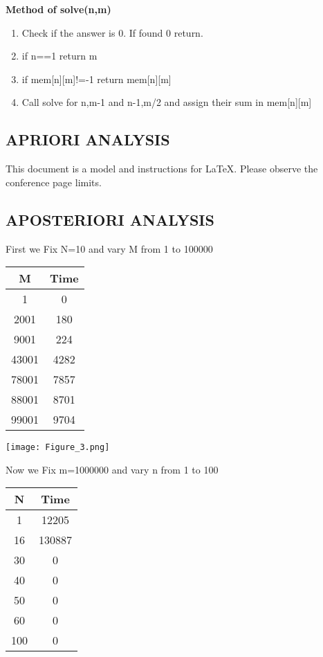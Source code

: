 \documentclass[conference]{IEEEtran}
\begin{document}
\textbf{Method of solve(n,m)}

\begin{enumerate}
    \item Check if the answer is 0. If found 0 return.
    \item if n==1 return m
    \item if mem[n][m]!=-1 return mem[n][m]
    \item Call solve for n,m-1 and n-1,m/2 and assign their sum in mem[n][m]
	
\end{enumerate}

\subsection{APRIORI ANALYSIS }

This document is a model and instructions for \LaTeX.
Please observe the conference page limits. 

\subsection{APOSTERIORI ANALYSIS }

First we Fix N=10 and vary M from 1 to 100000

\begin{center}
   \begin{tabular}{|c|c|}
   \hline
   M & Time \\
   \hline\hline
    1 & 0 \\
    \hline
    2001 & 180 \\
    \hline
    9001 & 224 \\
    \hline
    43001 & 4282 \\
    \hline
    78001 & 7857 \\
    \hline
    88001 & 8701 \\
    \hline
    99001 & 9704 \\
    \hline
    \end{tabular} 
\end{center}

\texttt{[image: Figure\_3.png]}

Now we Fix m=1000000 and vary n from 1 to 100

\begin{center}
   \begin{tabular}{|c|c|}
   \hline
   N & Time \\
   \hline\hline
    1 & 12205 \\
    \hline
    16 & 130887 \\
    \hline
    30 & 0 \\
    \hline
    40 & 0 \\
    \hline
    50 & 0 \\
    \hline
    60 & 0 \\
    \hline
    100 & 0 \\
    \hline
    \end{tabular} 
\end{center}
\end{document}

